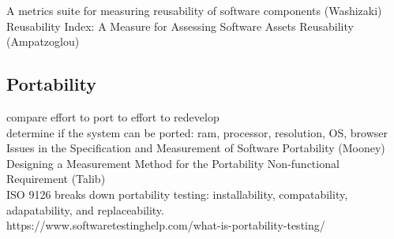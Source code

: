 \documentclass{article}
\begin{document}
A metrics suite for measuring reusability of software components (Washizaki)\\ 

Reusability Index: A Measure for Assessing Software Assets Reusability (Ampatzoglou) 
\subsection{Portability}
compare effort to port to effort to redevelop\\ 

determine if the system can be ported: ram, processor, resolution, OS, browser\\ 

Issues in the Specification and Measurement of Software Portability (Mooney)\\ 

Designing a Measurement Method for the Portability Non-functional Requirement (Talib)\\ 

ISO 9126 breaks down portability testing: installability, compatability, adapatability, and replaceability.\\ 

https://www.softwaretestinghelp.com/what-is-portability-testing/ 
\end{document}
